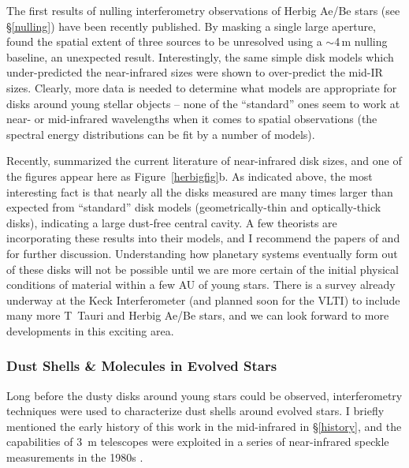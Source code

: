 \documentclass[12pt]{article}
\begin{document}
The first results of nulling interferometry observations of Herbig
Ae/Be stars (see \S\ref{nulling}) have been recently published.  By
masking a single large aperture, \citet{hinz2001} found the spatial
extent of three sources to be unresolved using a $\sim$4\,m nulling
baseline, an unexpected result.  Interestingly, the same simple disk
models which under-predicted the near-infrared sizes were shown to
over-predict the mid-IR sizes.  Clearly, more data is needed to
determine what models are appropriate for disks around young stellar
objects -- none of the ``standard'' ones seem to work at near- or
mid-infrared wavelengths when it comes to spatial observations (the
spectral energy distributions can be fit by a number of models).

Recently, \citet{monnier2002a} summarized the current literature of
near-infrared disk sizes, and one of the figures appear here as
Figure~\ref{herbigfig}b. As indicated above, the most interesting fact
is that nearly all the disks measured are many times larger than
expected from ``standard'' disk models (geometrically-thin and
optically-thick disks), indicating a large dust-free central cavity.
A few theorists are incorporating these results into their models, and
I recommend the papers of 
\citet{natta2001} and \citet{dullemond2001} for further discussion.
Understanding how planetary systems eventually form out of
these disks will not be possible until we are more certain of the
initial physical conditions of material within a few AU of young
stars.  There is a survey already underway at the Keck Interferometer
(and planned soon for the VLTI) to include many more T~Tauri and
Herbig Ae/Be stars, and we can look forward to more developments in
this exciting area.

\subsubsection{Dust Shells \& Molecules in Evolved Stars}
Long before the dusty disks around young stars could be observed,
interferometry techniques were used to characterize dust shells
around evolved stars.  I briefly mentioned the early history of this
work in the mid-infrared in \S\ref{history}, and the capabilities
of 3~m telescopes were exploited in a series of near-infrared
speckle measurements in the 1980s \citep[see especially][]{dyck1984}.
\end{document}
